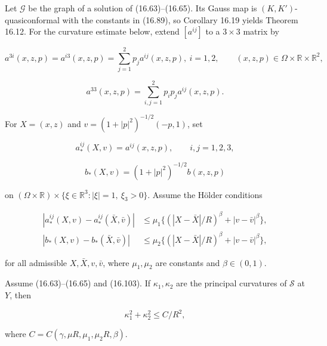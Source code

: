 Let $\mathscr G$ be the graph of a solution of (16.63)--(16.65). Its Gauss map is
$(K,K')$-quasiconformal with the constants in (16.89), so Corollary 16.19 yields
Theorem 16.12. For the curvature estimate below, extend $[a^{ij}]$ to a
$3\times3$ matrix by

\[
a^{3i}(x,z,p)=a^{i3}(x,z,p)=\sum_{j=1}^{2} p_j a^{ij}(x,z,p),\ i=1,2,
\qquad (x,z,p)\in\Omega\times\mathbb{R}\times\mathbb{R}^2,
\]

\[
a^{33}(x,z,p)=\sum_{i,j=1}^{2} p_i p_j a^{ij}(x,z,p).
\]

For $X=(x,z)$ and $v=(1+|p|^2)^{-1/2}(-p,1)$, set

\[
a_*^{ij}(X,v)=a^{ij}(x,z,p), \qquad i,j=1,2,3,
\]

\[
b_*(X,v)=(1+|p|^2)^{-1/2}b(x,z,p)
\]

on $(\Omega\times\mathbb R)\times\{\xi\in\mathbb R^3:|\xi|=1,\ \xi_3>0\}$.
Assume the H\"older conditions

\begin{equation}
\begin{aligned}
\left|a_*^{ij}(X,v)-a_*^{ij}(\bar X,\bar v)\right| &\le \mu_1\{(|X-\bar X|/R)^\beta+|v-\bar v|^\beta\},\\
\left|b_*(X,v)-b_*(\bar X,\bar v)\right| &\le \mu_2\{(|X-\bar X|/R)^\beta+|v-\bar v|^\beta\},
\end{aligned}
\tag{16.103}
\end{equation}

for all admissible $X,\bar X,v,\bar v$, where $\mu_1,\mu_2$ are constants and
$\beta\in(0,1)$.

\begin{theorem}\label{gilbarg-trudinger.thm.16.20.interior-curvature-estimate}
Assume (16.63)--(16.65) and (16.103). If $\kappa_1,\kappa_2$ are the principal curvatures of $\mathcal S$ at $Y$, then

\begin{equation}
\kappa_1^2+\kappa_2^2\le C/R^2,
\tag{16.104}
\end{equation}

where $C=C(\gamma,\mu R,\mu_1,\mu_2R,\beta)$.
\end{theorem}

